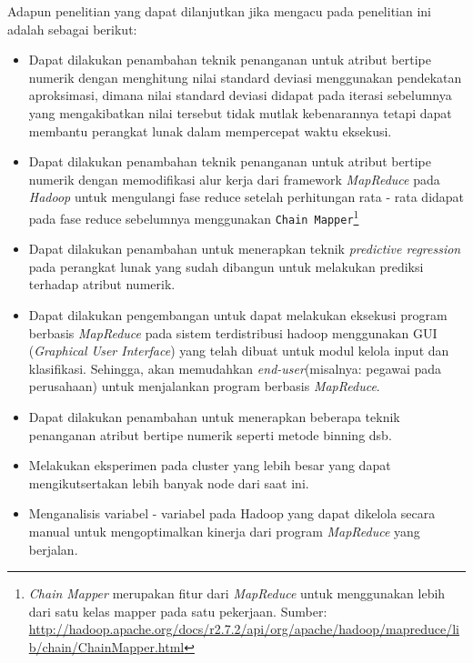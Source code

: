 Adapun penelitian yang dapat dilanjutkan jika mengacu pada penelitian ini adalah sebagai berikut:
\begin{itemize}
	\item Dapat dilakukan penambahan teknik penanganan untuk atribut bertipe numerik dengan menghitung nilai standard deviasi menggunakan pendekatan aproksimasi, dimana nilai standard deviasi didapat pada iterasi sebelumnya yang mengakibatkan nilai tersebut tidak mutlak kebenarannya tetapi dapat membantu perangkat lunak dalam mempercepat waktu eksekusi.
	\item Dapat dilakukan penambahan teknik penanganan untuk atribut bertipe numerik dengan memodifikasi alur kerja dari framework \textit{MapReduce} pada \textit{Hadoop} untuk mengulangi fase reduce setelah perhitungan rata - rata didapat pada fase reduce sebelumnya menggunakan \texttt{Chain Mapper}\footnote{\textit{Chain Mapper} merupakan fitur dari \textit{MapReduce} untuk menggunakan lebih dari satu kelas mapper pada satu pekerjaan. Sumber: \url{http://hadoop.apache.org/docs/r2.7.2/api/org/apache/hadoop/mapreduce/lib/chain/ChainMapper.html}}
	\item Dapat dilakukan penambahan untuk menerapkan teknik \textit{predictive regression} pada perangkat lunak yang sudah dibangun untuk melakukan prediksi terhadap atribut numerik.
	\item Dapat dilakukan pengembangan untuk dapat melakukan eksekusi program berbasis \textit{MapReduce} pada sistem terdistribusi hadoop menggunakan GUI (\textit{Graphical User Interface}) yang telah dibuat untuk modul kelola input dan klasifikasi. Sehingga, akan memudahkan \textit{end-user}(misalnya: pegawai pada perusahaan) untuk menjalankan program berbasis \textit{MapReduce}.
	\item Dapat dilakukan penambahan untuk menerapkan beberapa teknik penanganan atribut bertipe numerik seperti metode binning dsb.
	\item Melakukan eksperimen pada cluster yang lebih besar yang dapat mengikutsertakan lebih banyak node dari saat ini.
	\item Menganalisis variabel - variabel pada Hadoop yang dapat dikelola secara manual untuk mengoptimalkan kinerja dari program \textit{MapReduce} yang berjalan.
\end{itemize}

